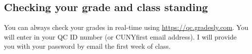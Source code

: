 \subsection*{Checking your grade and class standing}

You can always check your grades in real-time using \url{https://qc.gradesly.com}. You will enter in your QC ID number (or CUNYfirst email address). I will provide you with your password by email the first week of class.